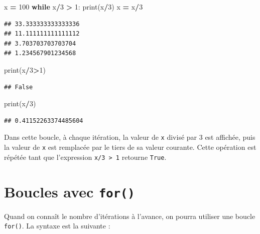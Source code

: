 \documentclass[
  12pt,
]{book}
\newenvironment{Shaded}{\begin{snugshade}}{\end{snugshade}}
\newcommand{\BuiltInTok}[1]{#1}
\newcommand{\ControlFlowTok}[1]{\textcolor[rgb]{0.13,0.29,0.53}{\textbf{#1}}}
\newcommand{\DecValTok}[1]{\textcolor[rgb]{0.00,0.00,0.81}{#1}}
\newcommand{\NormalTok}[1]{#1}
\newcommand{\OperatorTok}[1]{\textcolor[rgb]{0.81,0.36,0.00}{\textbf{#1}}}
\numberwithin{equation}{section}
\numberwithin{countremarque}{section}
\begin{document}
\begin{Shaded}
\begin{Highlighting}[]
\NormalTok{x }\OperatorTok{=} \DecValTok{100}
\ControlFlowTok{while}\NormalTok{ x}\OperatorTok{/}\DecValTok{3} \OperatorTok{\textgreater{}} \DecValTok{1}\NormalTok{:}
  \BuiltInTok{print}\NormalTok{(x}\OperatorTok{/}\DecValTok{3}\NormalTok{)}
\NormalTok{  x }\OperatorTok{=}\NormalTok{ x}\OperatorTok{/}\DecValTok{3}
\end{Highlighting}
\end{Shaded}

\begin{lstlisting}
## 33.333333333333336
## 11.111111111111112
## 3.703703703703704
## 1.234567901234568
\end{lstlisting}

\begin{Shaded}
\begin{Highlighting}[]
\BuiltInTok{print}\NormalTok{(x}\OperatorTok{/}\DecValTok{3}\OperatorTok{\textgreater{}}\DecValTok{1}\NormalTok{)}
\end{Highlighting}
\end{Shaded}

\begin{lstlisting}
## False
\end{lstlisting}

\begin{Shaded}
\begin{Highlighting}[]
\BuiltInTok{print}\NormalTok{(x}\OperatorTok{/}\DecValTok{3}\NormalTok{)}
\end{Highlighting}
\end{Shaded}

\begin{lstlisting}
## 0.41152263374485604
\end{lstlisting}

Dans cette boucle, à chaque itération, la valeur de \texttt{x} divisé par 3 est affichée, puis la valeur de \texttt{x} est remplacée par le tiers de sa valeur courante. Cette opération est répétée tant que l'expression \texttt{x/3\ \textgreater{}\ 1} retourne \texttt{True}.

\section{\texorpdfstring{Boucles avec \texttt{for()}}{Boucles avec for()}}\label{boucles-avec-for}

Quand on connaît le nombre d'itérations à l'avance, on pourra utiliser une boucle \texttt{for()}. La syntaxe est la suivante :
\end{document}
